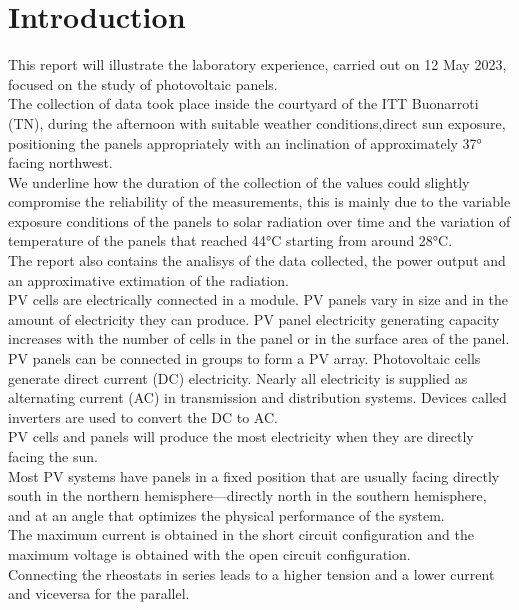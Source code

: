 \documentclass[12pt]{article}
\begin{document}
\section{Introduction}
This report will illustrate the laboratory experience, carried out on 12 May 2023, focused on the study of
photovoltaic panels.\\
The collection of data took place inside the courtyard of the ITT Buonarroti (TN), during the
afternoon with suitable weather conditions,direct sun exposure, positioning the panels appropriately with an
inclination of approximately 37° facing northwest.\\
We underline how the duration of the collection of the values could slightly compromise the reliability of
the measurements, this is mainly due to the variable exposure conditions of the panels to solar radiation
over time and the variation of temperature of the panels that reached 44°C starting from around 28°C.\\
The report also contains the analisys of the data collected, the power output and an approximative extimation
of the radiation.\\
PV cells are electrically connected in a module. PV panels vary in size and in the amount of electricity they can produce. PV panel electricity generating capacity increases with the number of cells in the panel or in the surface area of the panel. PV panels can be connected in groups to form a PV array.
Photovoltaic cells generate direct current (DC) electricity. Nearly all electricity is supplied as
alternating current (AC) in transmission and distribution systems. Devices called inverters are used to
convert the DC to AC.\\
PV cells and panels will produce the most electricity when they are directly facing the sun.\\
Most PV systems have panels in a fixed position that are usually facing directly south in the northern
hemisphere—directly north in the southern hemisphere, and at an angle that optimizes the physical
performance of the system.\\
The maximum current is obtained in the short circuit configuration and the maximum voltage is obtained
with the open circuit configuration.\\
Connecting the rheostats in series leads to a higher tension and a lower current and viceversa for the parallel.\\
\end{document}
